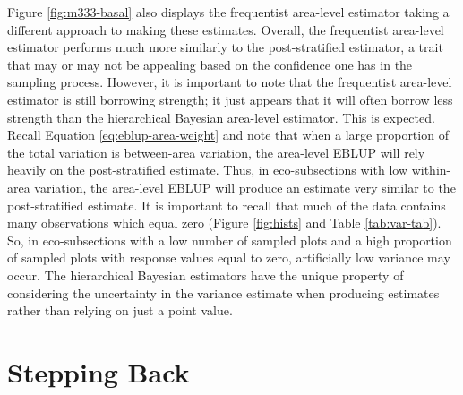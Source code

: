 \documentclass[12pt,twoside]{reedthesis}
\begin{document}
Figure \ref{fig:m333-basal} also displays the frequentist area-level estimator taking a different approach to making these estimates. Overall, the frequentist area-level estimator performs much more similarly to the post-stratified estimator, a trait that may or may not be appealing based on the confidence one has in the sampling process. However, it is important to note that the frequentist area-level estimator is still borrowing strength; it just appears that it will often borrow less strength than the hierarchical Bayesian area-level estimator. This is expected. Recall Equation \eqref{eq:eblup-area-weight} and note that when a large proportion of the total variation is between-area variation, the area-level EBLUP will rely heavily on the post-stratified estimate. Thus, in eco-subsections with low within-area variation, the area-level EBLUP will produce an estimate very similar to the post-stratified estimate. It is important to recall that much of the data contains many observations which equal zero (Figure \ref{fig:hists} and Table \ref{tab:var-tab}). So, in eco-subsections with a low number of sampled plots and a high proportion of sampled plots with response values equal to zero, artificially low variance may occur. The hierarchical Bayesian estimators have the unique property of considering the uncertainty in the variance estimate when producing estimates rather than relying on just a point value.

\hypertarget{stepping-back}{%
\section{Stepping Back}\label{stepping-back}}
\end{document}

